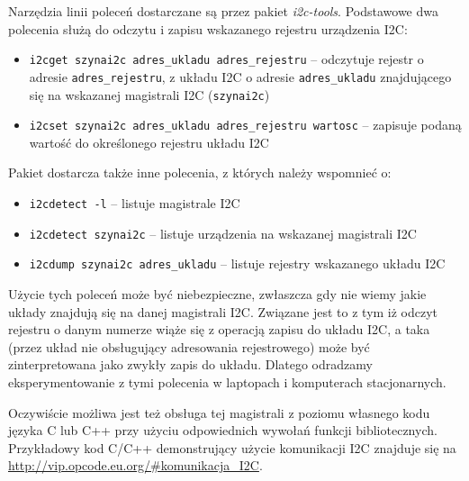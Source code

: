 Narzędzia linii poleceń dostarczane są przez pakiet \textit{i2c-tools}. Podstawowe dwa polecenia służą do odczytu i zapisu wskazanego rejestru urządzenia I2C:
\begin{itemize}
	\item \Verb$i2cget szynai2c adres_ukladu adres_rejestru$ – odczytuje rejestr o adresie \Verb$adres_rejestru$, z układu I2C o adresie \Verb$adres_ukladu$ znajdującego się na wskazanej magistrali I2C (\Verb$szynai2c$)
	\item \Verb$i2cset szynai2c adres_ukladu adres_rejestru wartosc$ – zapisuje podaną wartość do określonego rejestru układu I2C
\end{itemize}
Pakiet dostarcza także inne polecenia, z których należy wspomnieć o:
\begin{itemize}
	\item \Verb$i2cdetect -l$ – listuje magistrale I2C
	\item \Verb$i2cdetect szynai2c$ – listuje urządzenia na wskazanej magistrali I2C
	\item \Verb$i2cdump szynai2c adres_ukladu$ – listuje rejestry wskazanego układu I2C
\end{itemize}

 Użycie tych poleceń może być niebezpieczne, zwłaszcza gdy nie wiemy jakie układy znajdują się na danej magistrali I2C.
Związane jest to z tym iż odczyt rejestru o danym numerze wiąże się z operacją zapisu do układu I2C, a taka (przez układ nie obsługujący adresowania rejestrowego) może być zinterpretowana jako zwykły zapis do układu.
Dlatego odradzamy eksperymentowanie z tymi polecenia w laptopach i komputerach stacjonarnych.



Oczywiście możliwa jest też obsługa tej magistrali z poziomu własnego kodu języka C lub C++ przy użyciu odpowiednich wywołań funkcji bibliotecznych.
Przykładowy kod C/C++ demonstrujący użycie komunikacji I2C znajduje się na \url{http://vip.opcode.eu.org/#komunikacja_I2C}.

\ifdefined\useExternalSection
	\let\useExternalSection\undefined
\else
	\let\mysection\undefined
	\let\mysubsection\undefined
\fi
